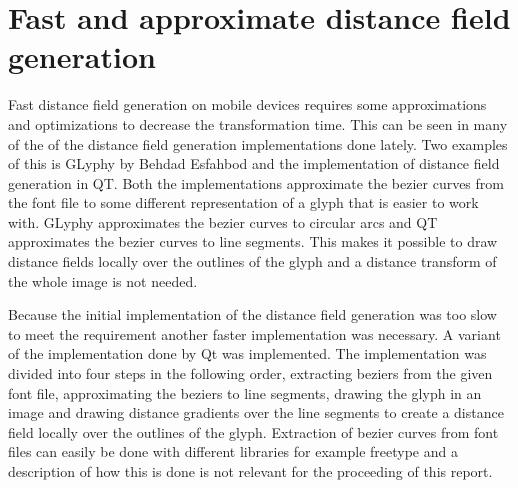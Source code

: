 \section{Fast and approximate distance field generation}
Fast distance field generation on mobile devices requires some approximations and optimizations to decrease the transformation time. This can be seen in many of the of the distance field generation implementations done lately. Two examples of this is GLyphy by Behdad Esfahbod and the implementation of distance field generation in QT. Both the implementations approximate the bezier curves from the font file to some different representation of a glyph that is easier to work with. GLyphy approximates the bezier curves to circular arcs and QT approximates the bezier curves to line segments. This makes it possible to draw distance fields locally over the outlines of the glyph and a distance transform of the whole image is not needed.

Because the initial implementation of the distance field generation was too slow to meet the requirement another faster implementation was necessary. A variant of the implementation done by Qt was implemented. The implementation was divided into four steps in the following order, extracting beziers from the given font file, approximating the beziers to line segments, drawing the glyph in an image and drawing distance gradients over the line segments to create a distance field locally over the outlines of the glyph. Extraction of bezier curves from font files can easily be done with different libraries for example freetype and a description of how this is done is not relevant for the proceeding of this report. 
